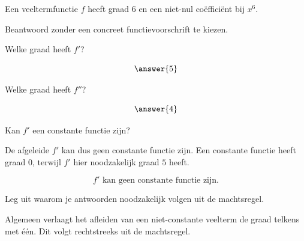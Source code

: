 \documentclass{ximera}
\begin{document}
  
  \begin{oefening}{\oefG}
  
  Een veeltermfunctie $f$ heeft graad $6$ en een niet-nul
  coëfficiënt bij $x^6$.
  
  Beantwoord zonder een concreet functievoorschrift te kiezen.
  
  \begin{question}
  
  Welke graad heeft $f'$?
  
  \[
  \answer{5}
  \]
  
  \end{question}
  
  \begin{question}
  
  Welke graad heeft $f''$?
  
  \[
  \answer{4}
  \]
  
  \end{question}
  
  \begin{question}
  
  Kan $f'$ een constante functie zijn?
  
  \begin{multipleChoice}
  \end{multipleChoice}

  \begin{oplossing}
    De afgeleide $f'$ kan dus geen constante functie zijn. Een constante
    functie heeft graad $0$, terwijl $f'$ hier noodzakelijk graad $5$ heeft.
    
    \[
    \boxed{\text{$f'$ kan geen constante functie zijn.}}
    \]
  \end{oplossing}
  
  \end{question}
  
  Leg uit waarom je antwoorden noodzakelijk volgen uit de machtsregel.

  \begin{oplossing}

Algemeen verlaagt het afleiden van een niet-constante veelterm de graad
telkens met één. Dit volgt rechtstreeks uit de machtsregel.


  \end{oplossing}
  
  \end{oefening}
  
\end{document}
